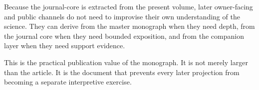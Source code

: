 Because the journal-core is extracted from the present volume, later owner-facing and public
channels do not need to improvise their own understanding of the science.
They can derive from the master monograph when they need depth, from the journal core when they
need bounded exposition, and from the companion layer when they need support evidence.

This is the practical publication value of the monograph.
It is not merely larger than the article.
It is the document that prevents every later projection from becoming a separate interpretive
exercise.

\clearpage
